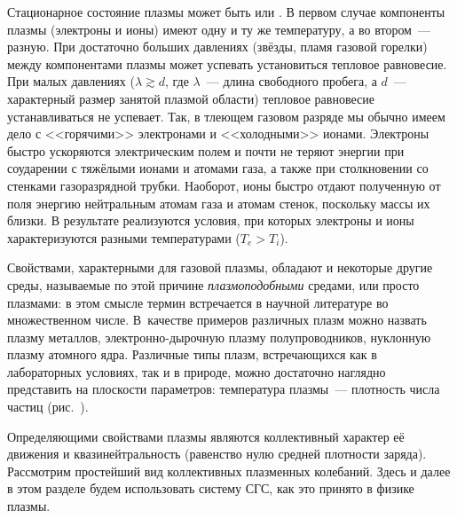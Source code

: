 Стационарное состояние плазмы может быть
 или .
В первом случае компоненты плазмы (электроны и ионы) имеют одну и ту же температуру,
а во втором~--- разную. При достаточно больших
давлениях (звёзды, пламя газовой горелки) между компонентами плазмы может
успевать установиться тепловое равновесие. При
малых давлениях ($\lambda\gtrsim d$, где $\lambda$~--- длина свободного пробега, а
$d$~--- характерный размер занятой
плазмой области) тепловое равновесие устанавливаться не успевает.
Так, в тлеющем газовом разряде мы обычно имеем дело с
<<горячими>> электронами и <<холодными>> ионами.
Электроны быстро ускоряются электрическим полем и почти не теряют
энергии при соударении с тяжёлыми ионами и атомами газа, а также при
столкновении со стенками газоразрядной трубки. Наоборот, ионы быстро отдают
полученную от поля энергию нейтральным атомам газа и атомам стенок, поскольку
массы их близки. В результате реализуются условия, при которых электроны
и ионы характеризуются разными температурами ($T_e > T_i$).


Свойствами, характерными для газовой плазмы, обладают и некоторые другие среды,
называемые по этой причине
\emph{плазмоподобными} средами, или просто плазмами: в этом смысле термин
 встречается в научной литературе во множественном числе.
В~качестве примеров различных плазм можно назвать плазму металлов,
электронно-дырочную плазму полупроводников, нуклонную плазму атомного ядра.
Различные типы плазм, встречающихся как в лабораторных условиях,
так и в природе, можно достаточно наглядно представить на плоскости параметров:
температура плазмы~--- плотность числа частиц (рис.~).



\label{sec:plasma}

Определяющими свойствами плазмы являются коллективный характер её движения
и квазинейтральность (равенство нулю средней плотности заряда).
Рассмотрим простейший вид коллективных плазменных колебаний. Здесь и далее
в этом разделе будем использовать систему СГС, как это принято в физике плазмы.


